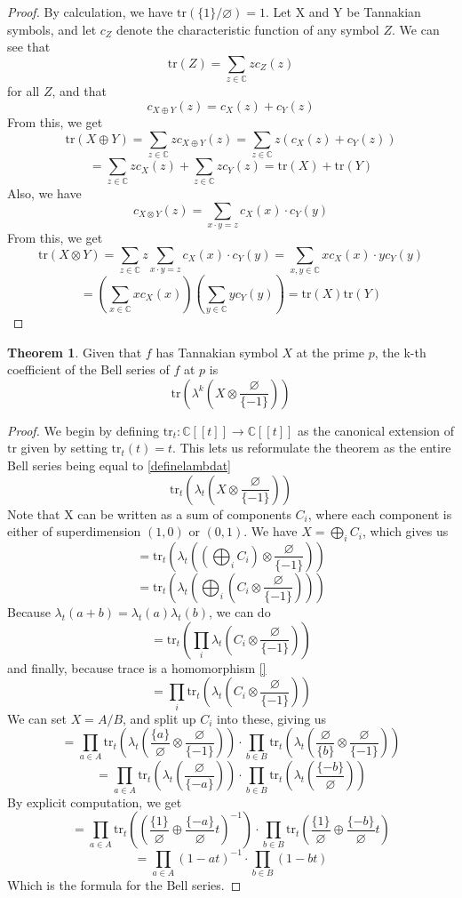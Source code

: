\documentclass[a4paper]{article}
\theoremstyle{definition}
\newtheorem{theorem}{Theorem}[section]
\theoremstyle{remark}
\newcommand{\tr}{\mathrm{tr}}
\newcommand{\C}{\mathbb{C}}
\begin{document}
\begin{proof}
By calculation, we have $\tr(\{1\}/\varnothing) = 1$. Let X and Y be Tannakian symbols, and let $c_Z$ denote the characteristic function of any symbol $Z$. We can see that 
$$\tr(Z) = \sum_{z \in \C} z c_Z(z)$$
for all $Z$, and that 
$$c_{X \oplus Y}(z) = c_X(z) + c_Y(z)$$
From this, we get
$$\tr(X \oplus Y) = \sum_{z \in \C} z c_{X \oplus Y}(z) = \sum_{z \in \C} z (c_X(z) + c_Y(z)) $$
$$ = \sum_{z \in \C} z c_X(z) + \sum_{z \in \C} z c_Y(z) = \tr(X) + \tr(Y)$$
Also, we have 
$$c_{X \otimes Y}(z) = \sum_{x \cdot y=z} c_X(x) \cdot c_Y(y)$$
From this, we get
$$\tr(X \otimes Y) = \sum_{z \in \C} z \sum_{x \cdot y=z}c_X(x) \cdot c_Y(y) = \sum_{x, y \in \C} x c_X(x) \cdot y c_Y(y) $$
$$=\left(\sum_{x \in \C} x c_X(x)\right)\left(\sum_{y \in \C} y c_Y(y)\right) = \tr(X)\tr(Y)$$
\end{proof}

\begin{theorem}
Given that $f$ has Tannakian symbol $X$ at the prime $p$, the k-th coefficient of the Bell series of $f$ at $p$ is
$$\tr\left(\lambda^{k}\left(X \otimes \frac{\varnothing}{\{-1\}}\right)\right)$$
\end{theorem}

\begin{proof}
We begin by defining $\tr_t : \C[[t]] \to \C[[t]]$ as the canonical extension of $\tr$ given by setting $\tr_t(t) = t$. This lets us reformulate the theorem as the entire Bell series being equal to \ref{definelambdat}
$$\tr_t\left(\lambda_t\left(X \otimes \frac{\varnothing}{\{-1\}}\right)\right)$$ 
Note that X can be written as a sum of components $C_i$, where each component is either of superdimension $(1, 0)$ or $(0, 1)$. We have $X = \bigoplus_i C_i$, which gives us
$$=\tr_t\left(\lambda_t\left(\left(\bigoplus_i C_i\right) \otimes \frac{\varnothing}{\{-1\}}\right)\right)$$ 
$$=\tr_t\left(\lambda_t\left(\bigoplus_i \left(C_i \otimes \frac{\varnothing}{\{-1\}}\right)\right)\right)$$ 
Because $\lambda_t(a + b) = \lambda_t(a)\lambda_t(b)$, we can do
$$=\tr_t\left(\prod_i\lambda_t\left(C_i \otimes \frac{\varnothing}{\{-1\}}\right)\right)$$ 
and finally, because trace is a homomorphism \ref{}
$$=\prod_i\tr_t\left(\lambda_t\left(C_i \otimes \frac{\varnothing}{\{-1\}}\right)\right)$$ 
We can set $X = A/B$, and split up $C_i$ into these, giving us 
$$=\prod_{a \in A}\tr_t\left(\lambda_t\left(\frac{\{a\}}{\varnothing} \otimes \frac{\varnothing}{\{-1\}}\right)\right) \cdot \prod_{b \in B}\tr_t\left(\lambda_t\left(\frac{\varnothing}{\{b\}} \otimes \frac{\varnothing}{\{-1\}}\right)\right)$$
$$=\prod_{a \in A}\tr_t\left(\lambda_t\left(\frac{\varnothing}{\{-a\}}\right)\right) \cdot \prod_{b \in B}\tr_t\left(\lambda_t\left(\frac{\{-b\}}{\varnothing}\right)\right)$$
By explicit computation, we get 
$$=\prod_{a \in A}\tr_t\left(\left(\frac{\{1\}}{\varnothing} \oplus \frac{\{-a\}}{\varnothing}t\right)^{-1}\right) \cdot \prod_{b \in B}\tr_t\left(\frac{\{1\}}{\varnothing} \oplus \frac{\{-b\}}{\varnothing}t\right)$$
$$=\prod_{a \in A}\left(1 - at\right)^{-1} \cdot \prod_{b \in B}\left(1 - bt\right)$$
Which is the formula for the Bell series.
\end{proof}
\end{document}
